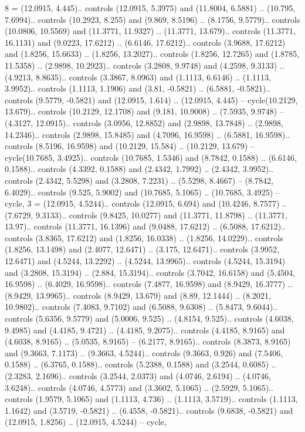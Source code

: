{8} = {(12.0915, 4.445).. controls (12.0915, 5.3975) and (11.8004, 6.5881) .. (10.795, 7.6994).. controls (10.2923, 8.255) and (9.869, 8.5196) .. (8.1756, 9.5779).. controls (10.0806, 10.5569) and (11.3771, 11.9327) .. (11.3771, 13.679).. controls (11.3771, 16.1131) and (9.0223, 17.6212) .. (6.6146, 17.6212).. controls (3.9688, 17.6212) and (1.8256, 15.6633) .. (1.8256, 13.2027).. controls (1.8256, 12.7265) and (1.8785, 11.5358) .. (2.9898, 10.2923).. controls (3.2808, 9.9748) and (4.2598, 9.3133) .. (4.9213, 8.8635).. controls (3.3867, 8.0963) and (1.1113, 6.6146) .. (1.1113, 3.9952).. controls (1.1113, 1.1906) and (3.81, -0.5821) .. (6.5881, -0.5821).. controls (9.5779, -0.5821) and (12.0915, 1.614) .. (12.0915, 4.445) -- cycle(10.2129, 13.679).. controls (10.2129, 12.1708) and (9.181, 10.9008) .. (7.5935, 9.9748) -- (4.3127, 12.0915).. controls (3.0956, 12.8852) and (2.9898, 13.7848) .. (2.9898, 14.2346).. controls (2.9898, 15.8485) and (4.7096, 16.9598) .. (6.5881, 16.9598).. controls (8.5196, 16.9598) and (10.2129, 15.584) .. (10.2129, 13.679) -- cycle(10.7685, 3.4925).. controls (10.7685, 1.5346) and (8.7842, 0.1588) .. (6.6146, 0.1588).. controls (4.3392, 0.1588) and (2.4342, 1.7992) .. (2.4342, 3.9952).. controls (2.4342, 5.5298) and (3.2808, 7.2231) .. (5.5298, 8.4667) -- (8.7842, 6.4029).. controls (9.525, 5.9002) and (10.7685, 5.1065) .. (10.7685, 3.4925) -- cycle},
{3} = {(12.0915, 4.5244).. controls (12.0915, 6.694) and (10.4246, 8.7577) .. (7.6729, 9.3133).. controls (9.8425, 10.0277) and (11.3771, 11.8798) .. (11.3771, 13.97).. controls (11.3771, 16.1396) and (9.0488, 17.6212) .. (6.5088, 17.6212).. controls (3.8365, 17.6212) and (1.8256, 16.0338) .. (1.8256, 14.0229).. controls (1.8256, 13.1498) and (2.4077, 12.6471) .. (3.175, 12.6471).. controls (3.9952, 12.6471) and (4.5244, 13.2292) .. (4.5244, 13.9965).. controls (4.5244, 15.3194) and (3.2808, 15.3194) .. (2.884, 15.3194).. controls (3.7042, 16.6158) and (5.4504, 16.9598) .. (6.4029, 16.9598).. controls (7.4877, 16.9598) and (8.9429, 16.3777) .. (8.9429, 13.9965).. controls (8.9429, 13.679) and (8.89, 12.1444) .. (8.2021, 10.9802).. controls (7.4083, 9.7102) and (6.5088, 9.6308) .. (5.8473, 9.6044).. controls (5.6356, 9.5779) and (5.0006, 9.525) .. (4.8154, 9.525).. controls (4.6038, 9.4985) and (4.4185, 9.4721) .. (4.4185, 9.2075).. controls (4.4185, 8.9165) and (4.6038, 8.9165) .. (5.0535, 8.9165) -- (6.2177, 8.9165).. controls (8.3873, 8.9165) and (9.3663, 7.1173) .. (9.3663, 4.5244).. controls (9.3663, 0.926) and (7.5406, 0.1588) .. (6.3765, 0.1588).. controls (5.2388, 0.1588) and (3.2544, 0.6085) .. (2.3283, 2.1696).. controls (3.2544, 2.0373) and (4.0746, 2.6194) .. (4.0746, 3.6248).. controls (4.0746, 4.5773) and (3.3602, 5.1065) .. (2.5929, 5.1065).. controls (1.9579, 5.1065) and (1.1113, 4.736) .. (1.1113, 3.5719).. controls (1.1113, 1.1642) and (3.5719, -0.5821) .. (6.4558, -0.5821).. controls (9.6838, -0.5821) and (12.0915, 1.8256) .. (12.0915, 4.5244) -- cycle},
